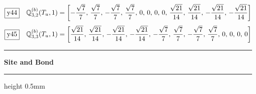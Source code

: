 \documentclass[fleqn,10pt,landscape]{jsarticle}
\begin{document}
\begin{dmath*}
\fbox{y44}\quad \mathbb{Q}_{3,2}^{(b)}(T_{u},1)=\left[ - \frac{\sqrt{7}}{7},\, \frac{\sqrt{7}}{7},\, - \frac{\sqrt{7}}{7},\, \frac{\sqrt{7}}{7},\, 0,\, 0,\, 0,\, 0,\, \frac{\sqrt{21}}{14},\, \frac{\sqrt{21}}{14},\, - \frac{\sqrt{21}}{14},\, - \frac{\sqrt{21}}{14} \right]
\end{dmath*}
\begin{dmath*}
\fbox{y45}\quad \mathbb{Q}_{3,3}^{(b)}(T_{u},1)=\left[ \frac{\sqrt{21}}{14},\, \frac{\sqrt{21}}{14},\, - \frac{\sqrt{21}}{14},\, - \frac{\sqrt{21}}{14},\, - \frac{\sqrt{7}}{7},\, \frac{\sqrt{7}}{7},\, - \frac{\sqrt{7}}{7},\, \frac{\sqrt{7}}{7},\, 0,\, 0,\, 0,\, 0 \right]
\end{dmath*}
\vspace{5mm}
\noindent \rule[0.5mm]{5mm}{0.5mm}\hspace{3mm}\textbf{Site and Bond}\hspace{3mm}\leaders\hrule height 0.5mm\hfill\kern0pt
\vspace{3mm}
\end{document}
